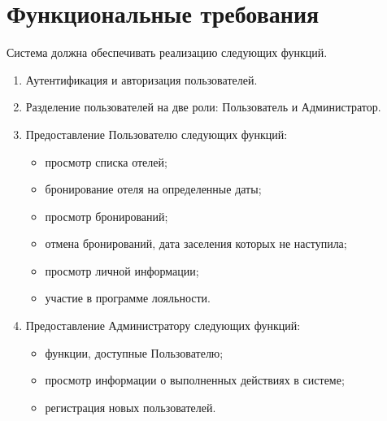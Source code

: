 \section{Функциональные требования}
Система должна обеспечивать реализацию следующих функций.
\begin{enumerate}
	\item Аутентификация и авторизация пользователей.
	\item Разделение пользователей на две роли: Пользователь и Администратор.
	\item Предоставление Пользователю следующих функций:
	\begin{itemize}
		\item просмотр списка отелей;
		\item бронирование отеля на определенные даты;
		\item просмотр бронирований;
		\item отмена бронирований, дата заселения которых не наступила;
		\item просмотр личной информации;
		\item участие в программе лояльности.
	\end{itemize}
	\item Предоставление Администратору следующих функций:
	\begin{itemize}
		\item функции, доступные Пользователю;
		\item просмотр информации о выполненных действиях в системе;
		\item регистрация новых пользователей.
	\end{itemize}
\end{enumerate}
